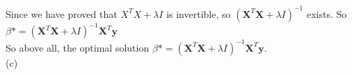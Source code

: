 \documentclass[10pt]{article}
\begin{document}
\begin{enumerate}[1.]
Since we have proved that $X^TX+\lambda I$ is invertible, so $(\mathbf{X}^T\mathbf{X}+\lambda I)^{-1}$ exists.
So $\beta *=(\mathbf{X}^T\mathbf{X}+\lambda I)^{-1}\mathbf{X}^T\mathbf{y}$\\

So above all, the optimal solution $\beta *=(\mathbf{X}^T\mathbf{X}+\lambda I)^{-1}\mathbf{X}^T\mathbf{y}$.\\

(c)     	  





      	  
      	  \newpage


\end{enumerate}
\end{document}
